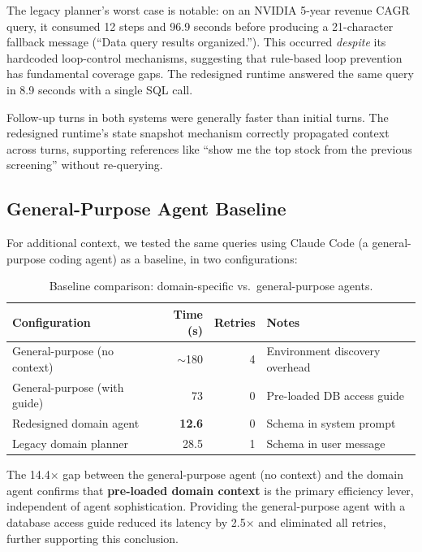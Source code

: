\documentclass{article}
\begin{document}
The legacy planner's worst case is notable: on an NVIDIA 5-year revenue CAGR query, it consumed 12 steps and 96.9 seconds before producing a 21-character fallback message (``Data query results organized.'').
This occurred \emph{despite} its hardcoded loop-control mechanisms, suggesting that rule-based loop prevention has fundamental coverage gaps.
The redesigned runtime answered the same query in 8.9 seconds with a single SQL call.

Follow-up turns in both systems were generally faster than initial turns. The redesigned runtime's state snapshot mechanism correctly propagated context across turns, supporting references like ``show me the top stock from the previous screening'' without re-querying.

\subsection{General-Purpose Agent Baseline}

For additional context, we tested the same queries using Claude Code (a general-purpose coding agent) as a baseline, in two configurations:

\begin{table}[H]
\centering
\caption{Baseline comparison: domain-specific vs.\ general-purpose agents.}
\label{tab:baseline}
\small
\begin{tabular}{@{}lrrl@{}}
\toprule
\textbf{Configuration} & \textbf{Time (s)} & \textbf{Retries} & \textbf{Notes} \\
\midrule
General-purpose (no context)   & ${\sim}$180 & 4 & Environment discovery overhead \\
General-purpose (with guide)   & 73          & 0 & Pre-loaded DB access guide \\
Redesigned domain agent        & \textbf{12.6} & 0 & Schema in system prompt \\
Legacy domain planner          & 28.5        & 1 & Schema in user message \\
\bottomrule
\end{tabular}
\end{table}

The 14.4$\times$ gap between the general-purpose agent (no context) and the domain agent confirms that \textbf{pre-loaded domain context} is the primary efficiency lever, independent of agent sophistication. Providing the general-purpose agent with a database access guide reduced its latency by 2.5$\times$ and eliminated all retries, further supporting this conclusion.
\end{document}
